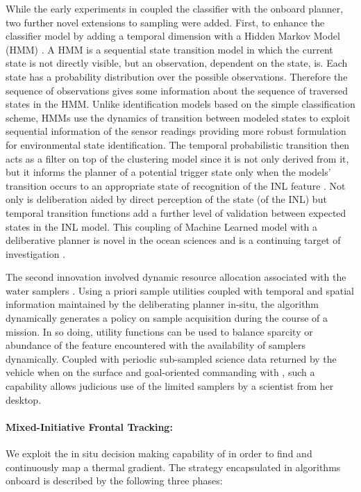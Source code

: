 While the early experiments in \cite{fox2007} coupled the classifier
with the onboard planner, two further novel extensions to sampling
were added. First, to enhance the classifier model by adding a
temporal dimension with a Hidden Markov Model (HMM) \cite{rabiner86,
  Rabiner89atutorial}.  A HMM is a sequential state transition model
in which the current state is not directly visible, but an
observation, dependent on the state, is.  Each state has a probability
distribution over the possible observations.  Therefore the sequence
of observations gives some information about the sequence of traversed
states in the HMM. Unlike identification models based on the simple
classification scheme, HMMs use the dynamics of transition between
modeled states to exploit sequential information of the sensor
readings providing more robust formulation for environmental state
identification. The temporal probabilistic transition then acts as a
filter on top of the clustering model 
since it is not only derived from it, but it informs the planner of a
potential trigger state only when the models' transition occurs to an
appropriate state of recognition of the INL feature
\cite{mcgann08b}. Not only is deliberation aided by direct perception
of the state (of the INL) but temporal transition functions add a
further level of validation between expected states in the INL
model. This coupling of Machine Learned model with a deliberative
planner is novel in the ocean sciences and is a continuing target of
investigation \cite{kumar11}.

The second innovation involved dynamic resource allocation associated
with the water samplers \cite{olaya11}. Using a priori sample
utilities coupled with temporal and spatial information maintained by
the deliberating planner in-situ, the algorithm dynamically generates
a policy on sample acquisition during the course of a mission. In so
doing, utility functions can be used to balance sparcity or abundance
of the feature encountered with the availability of samplers
dynamically. Coupled with periodic sub-sampled science data returned
by the vehicle when on the surface and goal-oriented commanding with
\rxe, such a capability allows judicious use of the limited samplers
by a scientist from her desktop.


\paragraph {Mixed-Initiative Frontal Tracking:} We exploit the
in situ decision making capability of \rx in order to find and
continuously map a thermal gradient. The strategy encapsulated in
algorithms onboard is described by the following three phases:

